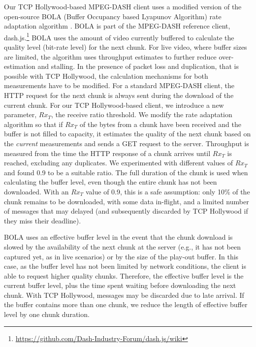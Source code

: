Our TCP Hollywood-based MPEG-DASH client uses a modified version of the open-source BOLA 
(Buffer Occupancy based Lyapunov Algorithm) rate adaptation algorithm \cite{spiteri2016bola}. 
BOLA is part of the MPEG-DASH reference
client, dash.js.\footnote{\url{https://github.com/Dash-Industry-Forum/dash.js/wiki}}
BOLA uses the amount of video currently buffered to calculate the quality level (bit-rate
level) for the next chunk. For live video, where buffer sizes are limited, the algorithm
uses throughput estimates to further reduce over-estimation and stalling. In the presence
of packet loss and duplication, that is possible with TCP Hollywood, the calculation 
mechanisms for both measurements have to be modified. For a standard MPEG-DASH client,
the HTTP request for the next chunk is always sent 
during the download of the current chunk. For our TCP Hollywood-based client, we
introduce a new parameter, $Rx_{T}$, the receive ratio threshold. We modify
the rate adaptation algorithm so that if $Rx_{T}$ of the
bytes from a chunk have been received and the buffer is not filled to capacity, 
it estimates the quality of the next chunk based on the \emph{current} measurements and
sends a GET request to the server. Throughput is measured from the time the HTTP response
of a chunk arrives until $Rx_{T}$ is reached, excluding any duplicates. We experimented
with different values of $Rx_{T}$ and found 0.9 to be a suitable ratio. The full duration
of the chunk is used when calculating the buffer level, even though the entire chunk has
not been downloaded. With an $Rx_{T}$ value of 0.9, this is a safe assumption: only 10\%
of the chunk remains to be downloaded, with some data in-flight, and a limited number of
messages that may delayed (and subsequently discarded by TCP Hollywood if
they miss their deadline).

BOLA uses an effective buffer level in the event that the chunk download is slowed by
the availability of the next chunk at the server (e.g., it has not been captured yet, as
in live scenarios) or by the size of the play-out buffer. In this case, as the buffer level has not
been limited by network conditions, the client is able to request higher quality chunks.
Therefore, the effective buffer level is the current buffer level, plus the time spent
waiting before downloading the next chunk. With TCP Hollywood, messages may be discarded
due to late arrival. If the buffer contains more than one chunk, we reduce the length of
effective buffer level by one chunk duration.



